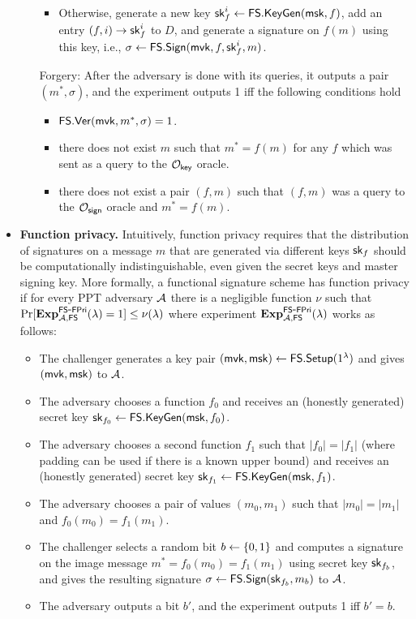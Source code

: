 \documentclass[11pt]{llncs}
\begin{document}
\begin{itemize}
\begin{itemize}
\begin{itemize}
\item Otherwise, generate a new key ${\sf sk}_f^i \gets {\sf FS.KeyGen}({\sf msk},f)$, add an
entry $(f,i) \to {\sf sk}_f^i$ to $D$, and generate a signature on $f(m)$ using this
key, i.e., $\sigma \gets {\sf FS.Sign}({\sf mvk}, f, {\sf sk}_f^i, m)$.\\

\end{itemize}

\item[Forgery:] After the adversary is done with its queries, it outputs a pair
$(m^*, \sigma)$, and the experiment outputs 1 iff the following conditions hold
\begin{itemize}
\item ${\sf FS.Ver}({\sf mvk},  m^*, \sigma)=1$.
\item there does not exist $m$ such that $m^* = f(m)$ for any $f$ which was
 sent as a query to the $\cal O_{\mathsf{key}}$ oracle.
\item there does not exist a pair $(f,m)$ such that $(f,m)$ was a query to the
 $\cal O_{\mathsf{sign}}$ oracle and $m^*= f(m)$.
\end{itemize}
\end{itemize}


\item \textbf{Function privacy.} Intuitively, function privacy requires that the
distribution of signatures on a message $m$ that are generated via different
keys ${\sf sk}_f$ should be computationally indistinguishable, even given the 
secret keys and master signing key. 
More formally, a functional signature scheme has function privacy if for every
PPT adversary ${\cal A}$ there is a negligible function $\nu$ such that
$\Pr[\mathbf{Exp}^{\sf FS\mbox{-}FPri}_{{\cal A}, {\sf FS}}(\lambda) = 1] \leq \nu(\lambda)$ where experiment 
$\mathbf{Exp}^{\sf FS\mbox{-}FPri}_{{\cal A}, {\sf FS}}(\lambda)$ works as follows:
\begin{itemize}
\item The challenger generates a key pair $({\sf mvk}, {\sf msk})  \gets {\sf FS.Setup}(1^\lambda)$
and gives $({\sf mvk}, {\sf msk})$ to ${\cal A}$.
\item The adversary chooses a function $f_0$ and receives an (honestly generated)
 secret key ${\sf sk}_{f_0} \gets {\sf FS.KeyGen}({\sf msk}, f_0)$.
\item The adversary chooses a second function $f_1$ such that $|f_0|=|f_1|$ (where
 padding can be used if there is a known upper bound) and receives an (honestly 
 generated) secret key ${\sf sk}_{f_1} \gets {\sf FS.KeyGen}({\sf msk}, f_1)$.
\item The adversary chooses a pair of values $(m_0, m_1)$ such that $|m_0| = |m_1|$
 and $f_0(m_0) = f_1(m_1)$.
\item The challenger selects a random bit $b \gets \{0,1\}$ and computes a signature  
 on the image message $m^* =f_0(m_0) = f_1(m_1)$ using secret key ${\sf sk}_{f_b}$,
 and gives the resulting signature $\sigma \gets  {\sf FS.Sign}({\sf sk}_{f_b}, m_b)$ to ${\cal A}$.
\item The adversary outputs a bit $b'$, and the experiment outputs 1 iff $b' = b$.
\end{itemize} 
\end{itemize}
\end{document}
